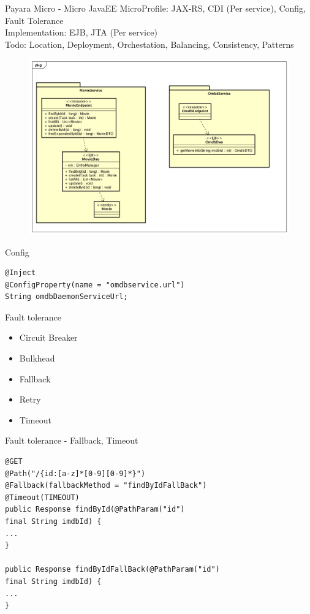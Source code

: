 \documentclass{beamer}
\begin{document}
\begin{frame}{Payara Micro - Micro JavaEE}
\footnotesize MicroProfile: JAX-RS, CDI (Per service), Config, Fault Tolerance\\
Implementation: EJB, JTA (Per service)\\
Todo: Location, Deployment, Orchestation, Balancing, Consistency, Patterns
		\begin{figure}
			\centering
			\includegraphics[width=0.95\linewidth]{Images/demomicro}
		\end{figure}

\end{frame}

\begin{frame}[fragile]{Config}
\begin{lstlisting}
@Inject
@ConfigProperty(name = "omdbservice.url")
String omdbDaemonServiceUrl;
\end{lstlisting}
\end{frame}

\begin{frame}{Fault tolerance}

\begin{itemize}
	\item Circuit Breaker
	\item Bulkhead
	\item Fallback
	\item Retry
	\item Timeout
\end{itemize}

\end{frame}


\begin{frame}[fragile]{Fault tolerance - Fallback, Timeout}
\begin{lstlisting}
@GET
@Path("/{id:[a-z]*[0-9][0-9]*}")
@Fallback(fallbackMethod = "findByIdFallBack")
@Timeout(TIMEOUT)
public Response findById(@PathParam("id") 
final String imdbId) {
...
}

public Response findByIdFallBack(@PathParam("id") 
final String imdbId) {
...
}
\end{lstlisting}
\end{frame}
\end{document}
